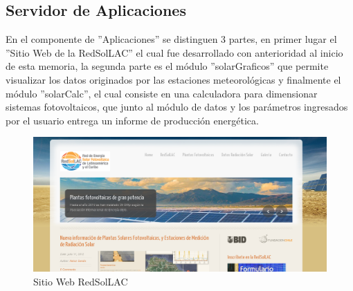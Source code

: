 \subsection{Servidor de Aplicaciones}
En el componente de ''Aplicaciones'' se distinguen 3 partes, en primer lugar el ''Sitio Web de la RedSolLAC'' el cual fue desarrollado con anterioridad al inicio de esta memoria, la segunda parte es el módulo ''solarGraficos'' que permite visualizar los datos originados por las estaciones meteorológicas y finalmente el módulo ''solarCalc'', el cual consiste en una calculadora para dimensionar sistemas fotovoltaicos, que junto al módulo de datos y los parámetros ingresados por el usuario entrega un informe de producción energética.

\begin{figure}[h!]
        \centering
        \includegraphics[scale=0.3]{images/webRedSolLAC}
        \caption{Sitio Web RedSolLAC}
        \label{webRed}
\end{figure}

